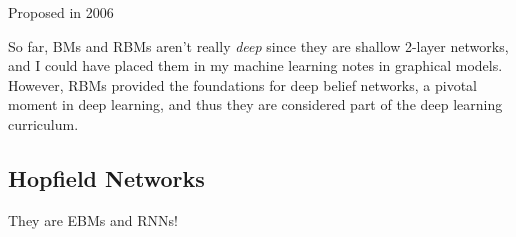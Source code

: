   Proposed in 2006

  So far, BMs and RBMs aren't really \textit{deep} since they are shallow 2-layer networks, and I could have placed them in my machine learning notes in graphical models. However, RBMs provided the foundations for deep belief networks, a pivotal moment in deep learning, and thus they are considered part of the deep learning curriculum. 

\subsection{Hopfield Networks}

  They are EBMs and RNNs!

